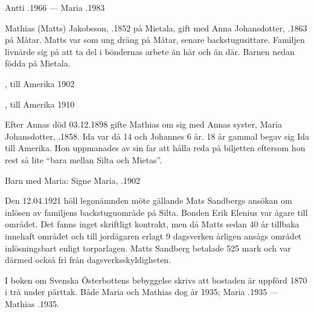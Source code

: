 Antti .1966  ---  Maria .1983


%
Mathias (Matts) Jakobsson, .1852 på Mietala, gift med Anna Johansdotter, .1863 på Måtar. Matts var som ung dräng på Måtar, senare backstugusittare. Familjen livnärde sig på att ta del i böndernas arbete än här och än där. Barnen nedan födda på Mietala.
\begin{jhchildren}
  \item {}, till Amerika 1902
  \item {}
  \item {}
  \item {}
  \item {}, till Amerika 1910
  \item {}
\end{jhchildren}

Efter Annas död 03.12.1898 gifte Mathias om sig med Annas syster, Maria Johansdotter,  .1858. Ida var då 14 och Johannes 6 år. 18 år gammal begav sig Ida till Amerika. Hon uppmanades av sin far att hålla reda på biljetten eftersom hon rest så lite ``bara mellan Silta och Mietas''.

Barn med Maria: Signe Maria, .1902

Den 12.04.1921 höll legonämnden möte gällande Mats Sandbergs ansökan om inlösen av familjens backstuguområde på Silta. Bonden Erik Elenius var ägare till området. Det fanns inget skriftligt kontrakt, men då Matts sedan 40 år tillbaka innehaft området och till jordägaren erlagt 9 dagsverken årligen ansågs området inlösningsbart enligt torparlagen. Matts Sandberg betalade 525 mark och var därmed också fri från dagsverksskyldigheten.

I boken om Svenska Österbottens bebyggelse skrivs att bostaden är uppförd 1870 i trä under pärttak. Både Maria och Mathias dog år 1935; Maria .1935  ---  Mathias .1935.


%


